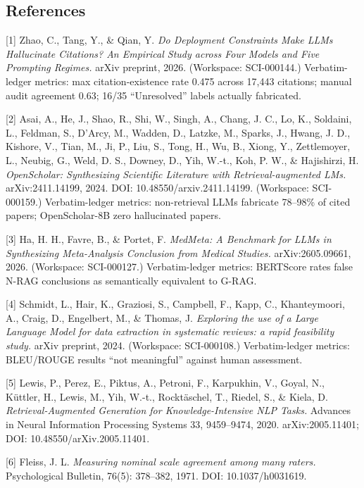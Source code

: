\documentclass[11pt]{article}
\begin{document}
\subsection{References}\label{references}

{[}1{]} Zhao, C., Tang, Y., \& Qian, Y. \emph{Do Deployment Constraints
Make LLMs Hallucinate Citations? An Empirical Study across Four Models
and Five Prompting Regimes.} arXiv preprint, 2026. (Workspace:
SCI-000144.) Verbatim-ledger metrics: max citation-existence rate 0.475
across 17,443 citations; manual audit agreement 0.63; 16/35
``Unresolved'' labels actually fabricated.

{[}2{]} Asai, A., He, J., Shao, R., Shi, W., Singh, A., Chang, J. C.,
Lo, K., Soldaini, L., Feldman, S., D'Arcy, M., Wadden, D., Latzke, M.,
Sparks, J., Hwang, J. D., Kishore, V., Tian, M., Ji, P., Liu, S., Tong,
H., Wu, B., Xiong, Y., Zettlemoyer, L., Neubig, G., Weld, D. S., Downey,
D., Yih, W.-t., Koh, P. W., \& Hajishirzi, H. \emph{OpenScholar:
Synthesizing Scientific Literature with Retrieval-augmented LMs.}
arXiv:2411.14199, 2024. DOI: 10.48550/arxiv.2411.14199. (Workspace:
SCI-000159.) Verbatim-ledger metrics: non-retrieval LLMs fabricate
78--98\% of cited papers; OpenScholar-8B zero hallucinated papers.

{[}3{]} Ha, H. H., Favre, B., \& Portet, F. \emph{MedMeta: A Benchmark
for LLMs in Synthesizing Meta-Analysis Conclusion from Medical Studies.}
arXiv:2605.09661, 2026. (Workspace: SCI-000127.) Verbatim-ledger
metrics: BERTScore rates false N-RAG conclusions as semantically
equivalent to G-RAG.

{[}4{]} Schmidt, L., Hair, K., Graziosi, S., Campbell, F., Kapp, C.,
Khanteymoori, A., Craig, D., Engelbert, M., \& Thomas, J.
\emph{Exploring the use of a Large Language Model for data extraction in
systematic reviews: a rapid feasibility study.} arXiv preprint, 2024.
(Workspace: SCI-000108.) Verbatim-ledger metrics: BLEU/ROUGE results
``not meaningful'' against human assessment.

{[}5{]} Lewis, P., Perez, E., Piktus, A., Petroni, F., Karpukhin, V.,
Goyal, N., Küttler, H., Lewis, M., Yih, W.-t., Rocktäschel, T., Riedel,
S., \& Kiela, D. \emph{Retrieval-Augmented Generation for
Knowledge-Intensive NLP Tasks.} Advances in Neural Information
Processing Systems 33, 9459--9474, 2020. arXiv:2005.11401; DOI:
10.48550/arXiv.2005.11401.

{[}6{]} Fleiss, J. L. \emph{Measuring nominal scale agreement among many
raters.} Psychological Bulletin, 76(5): 378--382, 1971. DOI:
10.1037/h0031619.
\end{document}
